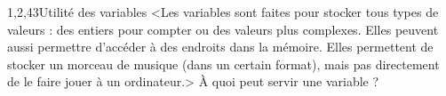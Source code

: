 \begin{quiz}[title={Notion de variable}]
\begin{quizquestion}[b]{1,2,4}{3}{Utilité des variables}
<Les variables sont faites pour stocker tous types de valeurs : des entiers pour compter ou des valeurs plus complexes. Elles peuvent aussi permettre d'accéder à des endroits dans la mémoire. Elles permettent de stocker un morceau de musique (dans un certain format), mais pas directement de le faire jouer à un ordinateur.>
À quoi peut servir une variable ?
\end{quizquestion}
\end{quiz}


